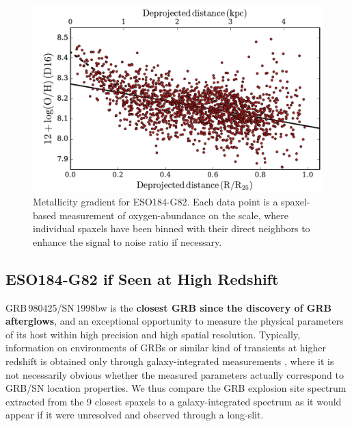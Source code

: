 \documentclass[traditabstract]{aa}
\begin{document}

\begin{figure}
\includegraphics[angle=0, width=0.99\columnwidth]{Figs/MUSE_SN1998bw_metgrad.pdf}
\caption{Metallicity gradient for ESO184-G82. Each data point is a spaxel-based measurement of oxygen-abundance on the \citet{2016Ap&SS.361...61D} scale, where individual spaxels have been binned with their direct neighbors to enhance the signal to noise ratio if necessary.}
\label{fig:metgrad}
\end{figure}

\subsection{ESO184-G82 if Seen at High Redshift}

GRB\,980425/SN\,1998bw is the \textbf{closest GRB since the discovery of GRB afterglows}, and an exceptional opportunity to measure the physical parameters of its host within high precision and high spatial resolution. Typically, information on environments of GRBs or similar kind of transients  at higher redshift is obtained only through galaxy-integrated measurements \citep{2015A&A...581A.125K, 2016A&A...590A.129J}, where it is not necessarily obvious whether the measured parameters actually correspond to GRB/SN location properties. We thus compare the GRB explosion site spectrum extracted from the 9 closest spaxels to a galaxy-integrated spectrum as it would appear if it were unresolved and observed through a long-slit. 
\end{document}
